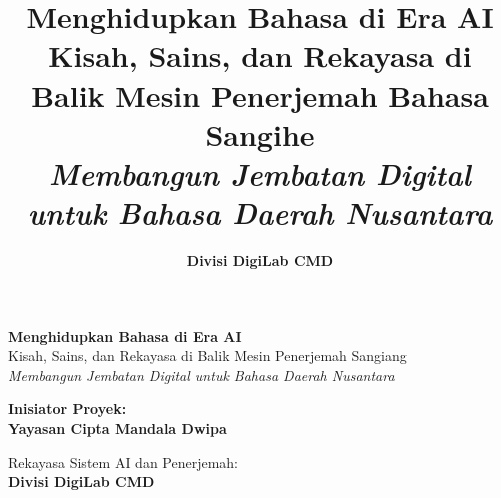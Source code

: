 \documentclass[11pt,twoside,openright]{book}
\title{
    {\Huge\sffamily\bfseries Menghidupkan Bahasa di Era AI}\\[0.5em]
    {\Large\sffamily Kisah, Sains, dan Rekayasa di Balik Mesin Penerjemah Bahasa Sangihe}\\[1em]
    {\normalsize\itshape Membangun Jembatan Digital untuk Bahasa Daerah Nusantara}
}
\author{\textbf{Divisi DigiLab CMD}}
\date{\StatLastSyncDate}
\begin{document}
\frontmatter

\begin{titlepage}
    \centering
    \vspace*{1.5cm}
    
    {\Huge\sffamily\bfseries\color{deepNavy} Menghidupkan Bahasa di Era AI}\\[0.6em]
    {\LARGE\sffamily\color{primaryBlue} Kisah, Sains, dan Rekayasa di Balik Mesin Penerjemah Sangiang}\\[1.5em]
    {\large\itshape Membangun Jembatan Digital untuk Bahasa Daerah Nusantara}
    
    \vspace{2.5cm}
    \begin{tcolorbox}[
        enhanced,
        colback=bgGray,
        colframe=primaryBlue,
        arc=2mm,
        width=0.85\textwidth,
        boxrule=0.8pt,
        halign=center
    ]
        {\small\sffamily\color{deepNavy}\textbf{Inisiator Proyek:}}\\[0.3em]
        {\Large\sffamily\bfseries\color{primaryBlue} Yayasan Cipta Mandala Dwipa}
    \end{tcolorbox}

    \vfill

    {\normalsize\sffamily Rekayasa Sistem AI dan Penerjemah:\\[0.4em] \textbf{\Large Divisi DigiLab CMD}}\\[1.5em]
    {\small\sffamily \StatLastSyncDate}
    \vspace*{1cm}
\end{titlepage}
\end{document}
